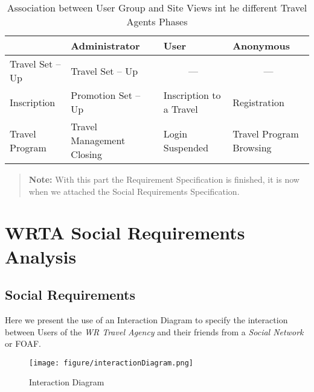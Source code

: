 \documentclass[a4paper]{memoir}
\begin{document}
		\begin{table}[htbp]
		\begin{tabular}{|l|l|l|l|}
		\hline
		 & Administrator & User & Anonymous \\ \hline
		Travel Set -- Up & Travel Set -- Up & \multicolumn{1}{c|}{---} & \multicolumn{1}{c|}{---} \\ \hline
		Inscription & Promotion Set -- Up & Inscription to a Travel & Registration \\ \hline
		Travel Program & Travel Management Closing & Login Suspended & Travel Program Browsing \\ \hline
		\end{tabular}
		\caption{Association between User Group and Site Views int he different Travel Agents Phases}
		\label{tab:associationUG_SV}
		\end{table}
		\begin{quotation}
			\textbf{Note:} With this part the Requirement Specification is finished, it is now when we attached the Social Requirements Specification.
		\end{quotation}
		
\section{WRTA Social Requirements Analysis}
	\subsection{Social Requirements}
		Here we present the use of an Interaction Diagram to specify the interaction between Users of the \textit{WR Travel Agency} and their friends from a \textit{Social Network} or \ac{FOAF}.
		
		\begin{figure}[here]
			\texttt{[image: figure/interactionDiagram.png]}
			\caption{Interaction Diagram}
			\label{fig:interactionDiagram}
		\end{figure}
		
\end{document}
